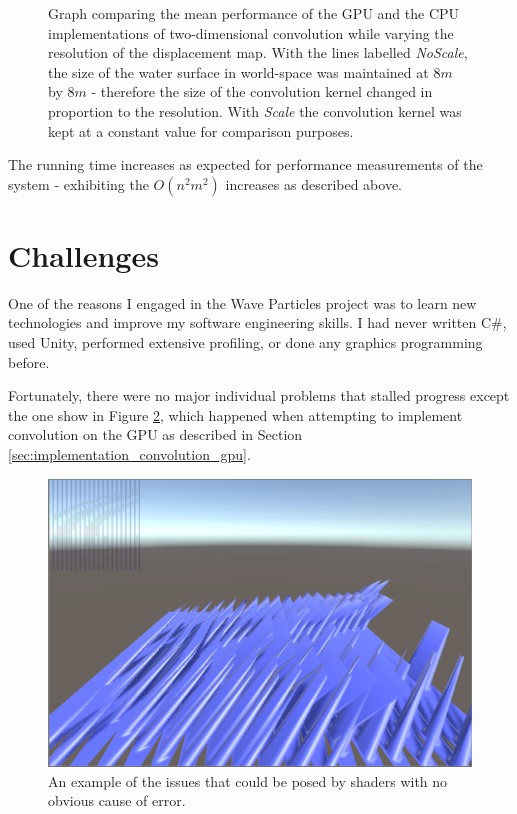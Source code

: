 \documentclass[12pt,a4paper,twoside]{report}
\begin{document}

\begin{figure}[h]
\centering

\caption{Graph comparing the mean performance of the GPU and the CPU
implementations of two-dimensional convolution while varying the resolution of
the displacement map. With the lines labelled \textit{NoScale}, the size of the
water surface in world-space was maintained at $8m$ by $8m$ - therefore the
size of the convolution kernel changed in proportion to the resolution. With
\textit{Scale} the convolution kernel was kept at a constant value for
comparison purposes.}
\label{fig:graph_convolution_2D_GPU_CPU}
\end{figure}

The running time increases as expected for performance measurements of the
system - exhibiting the $O(n^2m^2)$ increases as described above.

\section{Challenges}
\label{sec:evaluation_challenges}

One of the reasons I engaged in the Wave Particles project was to learn new
technologies and improve my software engineering skills. I had never written
C\#, used Unity, performed extensive profiling, or done any graphics
programming before.

Fortunately, there were no major individual problems that stalled progress
except the one show in Figure \ref{fig:texture_copy_issues}, which happened
when attempting to implement convolution on the GPU as described in Section
\ref{sec:implementation_convolution_gpu}.

\begin{figure}[h]
\centering
\includegraphics[width=0.8\linewidth]{texture_copy_issues}
\caption{An example of the issues that could be posed by shaders with no obvious
cause of error.}
\label{fig:texture_copy_issues}
\end{figure}
\end{document}
